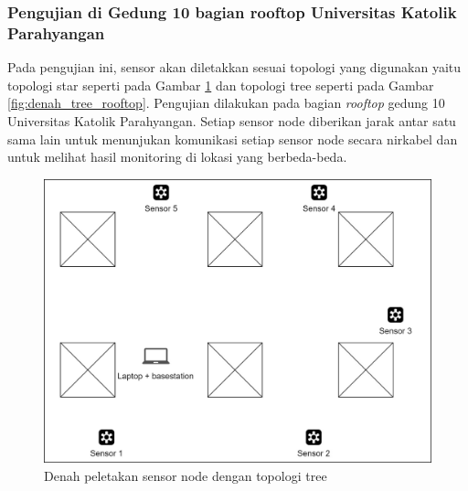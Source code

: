 \subsubsection{Pengujian di Gedung 10 bagian rooftop Universitas Katolik Parahyangan}

Pada pengujian ini, sensor akan diletakkan sesuai topologi yang digunakan yaitu topologi star seperti pada Gambar \ref{fig:denah_star_rooftop} dan topologi tree seperti pada Gambar \ref{fig:denah_tree_rooftop}. Pengujian dilakukan pada bagian \textit{rooftop} gedung 10 Universitas Katolik Parahyangan. Setiap sensor node diberikan jarak antar satu sama lain untuk menunjukan komunikasi setiap sensor node secara nirkabel dan untuk melihat hasil monitoring di lokasi yang berbeda-beda. 

\begin{figure}[H] 
	\centering  
	\includegraphics[scale=0.3]{Gambar/Hasil Sensing/Pengujian-Star Rooftop.jpg} 
	\caption[Denah peletakan sensor node dengan topologi tree]{Denah peletakan sensor node dengan topologi tree}
	\label{fig:denah_star_rooftop} 
\end{figure}

